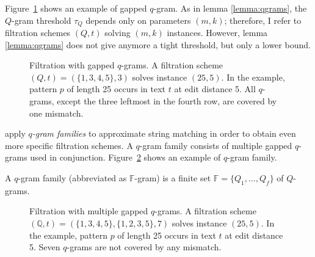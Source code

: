 Figure~\ref{fig:qgrams-gapped} shows an example of gapped $q$-gram.
As in lemma \ref{lemma:qgrams}, the $Q$-gram threshold $\tau_Q$ depends only on parameters $(m,k)$;
therefore, I refer to filtration schemes $(Q,t)$ solving $(m,k)$ instances.
However, lemma \ref{lemma:qgrams} does not give anymore a tight threshold, but only a lower bound.

\begin{figure}[t]
\begin{center}
\caption[Filtration with gapped $q$-grams]{Filtration with gapped $q$-grams. A filtration scheme $(Q,t) = (\{1, 3, 4, 5\},3)$ solves instance $(25,5)$. In the example, pattern $p$ of length 25 occurs in text $t$ at edit distance 5. All $q$-grams, except the three leftmost in the fourth row, are covered by one mismatch.}
\label{fig:qgrams-gapped}

\end{center}
\end{figure}

\cite{Kucherov2005} apply \emph{$q$-gram families} to approximate string matching in order to obtain even more specific filtration schemes.
A $q$-gram family consists of multiple gapped $q$-grams used in conjunction.
Figure~\ref{fig:qgrams-multiple} shows an example of $q$-gram family.

\begin{definition}
A $q$-gram family (abbreviated as $\mathbb{F}$-gram) is a finite set $\mathbb{F} = \{ Q_1, \dots, Q_f \}$ of $Q$-grams.
\end{definition}


\begin{figure}[b]
\begin{center}
\caption[Filtration with multiple gapped $q$-grams]{Filtration with multiple gapped $q$-grams. A filtration scheme $(\mathbb{Q},t) = (\{1, 3, 4, 5\},\{1, 2, 3, 5\},7)$ solves instance $(25,5)$. In the example, pattern $p$ of length 25 occurs in text $t$ at edit distance 5. Seven $q$-grams are not covered by any mismatch.}
\label{fig:qgrams-multiple}

\end{center}
\end{figure}

